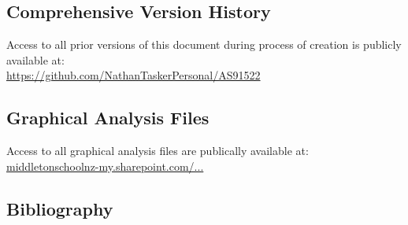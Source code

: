 \documentclass[11pt, a4paper]{article}
\begin{document}
	\subsection{Comprehensive Version History}
	Access to all prior versions of this document during process of creation is publicly available at:\\
	\url{https://github.com/NathanTaskerPersonal/AS91522}
	\subsection{Graphical Analysis Files}
	Access to all graphical analysis files are publically available at:\\
	\href{https://middletonschoolnz-my.sharepoint.com/:f:/g/personal/taskern_middleton_school_nz/EhEmw21C2L9Fn9BYUy2ccwMBn6xCUF93vtfvtT_5_rkxbA?e=Tp02lP}{middletonschoolnz-my.sharepoint.com/...}
	\subsection{Bibliography}
\end{document}

